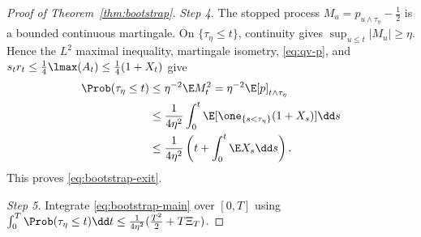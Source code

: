 \documentclass[../../main.tex]{subfiles}
\begin{document}
\begin{proof}[Proof of Theorem~\ref{thm:bootstrap}]
\emph{Step 4.} The stopped process
$M_u=p_{u\wedge\tau_\eta}-\tfrac12$ is a bounded continuous martingale. On
$\{\tau_\eta\le t\}$, continuity gives $\sup_{u\le t}|M_u|\ge\eta$. Hence the $L^2$ maximal
inequality, martingale isometry, \eqref{eq:qv-p}, and
$s_tr_t\le\tfrac14\lmax(A_t)\le\tfrac14(1+X_t)$ give
\[
\begin{split}
  \Prob(\tau_\eta\le t)
  &\le\eta^{-2}\E M_t^2
   =\eta^{-2}\E[p]_{t\wedge\tau_\eta}\\
  &\le\frac1{4\eta^2}\int_0^t
       \E[\one_{\{s<\tau_\eta\}}(1+X_s)]\dd s\\
  &\le\frac1{4\eta^2}\left(t+\int_0^t\E X_s\dd s\right).
\end{split}
\]
This proves \eqref{eq:bootstrap-exit}.

\emph{Step 5.} Integrate \eqref{eq:bootstrap-main} over $[0,T]$ using
$\int_0^T\Prob(\tau_\eta\le t)\dd t\le\tfrac1{4\eta^2}(\tfrac{T^2}2+T\Xi_T)$.
\end{proof}
\end{document}
